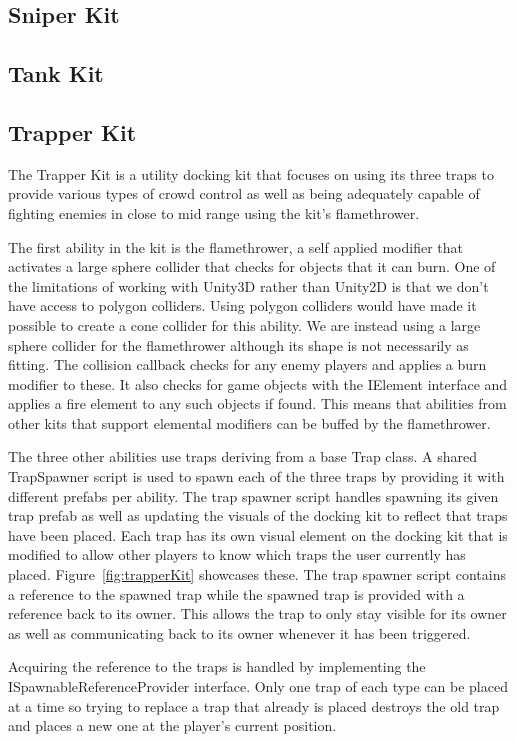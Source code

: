 \subsection{Sniper Kit}
\subsection{Tank Kit}

\subsection{Trapper Kit}
The Trapper Kit is a utility docking kit that focuses on using its three traps to provide various types of crowd control as well as being adequately capable of fighting enemies in close to mid range using the kit's flamethrower.  

The first ability in the kit is the flamethrower, a self applied modifier that activates a large sphere collider that checks for objects that it can burn. One of the limitations of working with Unity3D rather than Unity2D is that we don't have access to polygon colliders. Using polygon colliders would have made it possible to create a cone collider for this ability. We are instead using a large sphere collider for the flamethrower although its shape is not necessarily as fitting.
The collision callback checks for any enemy players and applies a burn modifier to these. It also checks for game objects with the IElement interface and applies a fire element to any such objects if found. This means that abilities from other kits that support elemental modifiers can be buffed by the flamethrower.

The three other abilities use traps deriving from a base Trap class. A shared TrapSpawner script is used to spawn each of the three traps by providing it with different prefabs per ability. 
The trap spawner script handles spawning its given trap prefab as well as updating the visuals of the docking kit to reflect that traps have been placed. Each trap has its own visual element on the docking kit that is modified to allow other players to know which traps the user currently has placed. Figure~\ref{fig:trapperKit} showcases these.
The trap spawner script contains a reference to the spawned trap while the spawned trap is provided with a reference back to its owner. This allows the trap to only stay visible for its owner as well as communicating back to its owner whenever it has been triggered. 

Acquiring the reference to the traps is handled by implementing the ISpawnableReferenceProvider interface. Only one trap of each type can be placed at a time so trying to replace a trap that already is placed destroys the old trap and places a new one at the player's current position.  

